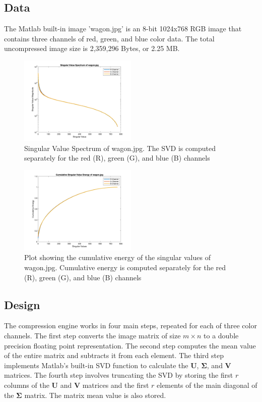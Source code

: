\documentclass[conference]{IEEEtran}
\begin{document}
    \subsection{Data}
    The Matlab built-in image 'wagon.jpg' is an 8-bit 1024x768 RGB image that contains three channels of red, green, and blue color data. The total uncompressed image size is 2,359,296 Bytes, or 2.25 MB.

    \begin{figure}[H]
        \includegraphics[width=0.5\textwidth]{svals_wagon_rgb}
        \caption{Singular Value Spectrum of wagon.jpg. The SVD is computed separately for the red (R), green (G), and blue (B) channels}
        \label{fig:svalplot}
    \end{figure}

    \begin{figure}[H]
        \includegraphics[width=0.5\textwidth]{sv_energy_wagon_rgb}
        \caption{Plot showing the cumulative energy of the singular values of wagon.jpg. Cumulative energy is computed separately for the red (R), green (G), and blue (B) channels}
        \label{fig:svalenergyplot}
    \end{figure}
    
    \subsection{Design}
    The compression engine works in four main steps, repeated for each of three color channels. The first step converts the image matrix of size $m \times n$ to a double precision floating point representation. The second step computes the mean value of the entire matrix and subtracts it from each element. The third step implements Matlab's built-in SVD function to calculate the $\mathbf{U}$, $\mathbf{\Sigma}$, and $\mathbf{V}$ matrices. The fourth step involves truncating the SVD by storing the first $r$ columns of the $\mathbf{U}$ and $\mathbf{V}$ matrices and the first $r$ elements of the main diagonal of the $\mathbf{\Sigma}$ matrix. The matrix mean value is also stored.
\end{document}
